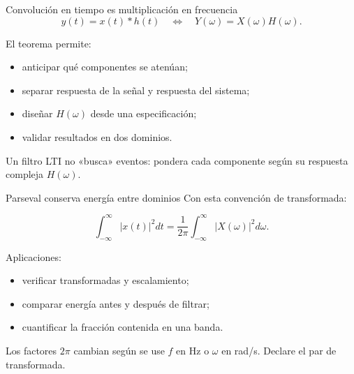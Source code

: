 \documentclass[
  ignorenonframetext,
  aspectratio=169,
  spanish,
  professionalfonts]{beamer}
\providecommand{\tightlist}{%
  \setlength{\itemsep}{0pt}\setlength{\parskip}{0pt}}
\begin{document}
\begin{frame}{Convolución en tiempo es multiplicación en frecuencia}
\protect{}\label{convoluciuxf3n-en-tiempo-es-multiplicaciuxf3n-en-frecuencia}
\[
y(t)=x(t)*h(t)
\quad\Longleftrightarrow\quad
Y(\omega)=X(\omega)H(\omega).
\]

El teorema permite:

\begin{itemize}
\tightlist
\item
  anticipar qué componentes se atenúan;
\item
  separar respuesta de la señal y respuesta del sistema;
\item
  diseñar \(H(\omega)\) desde una especificación;
\item
  validar resultados en dos dominios.
\end{itemize}

\begin{tcolorbox}[enhanced jigsaw, arc=.35mm, bottomrule=.15mm, bottomtitle=1mm, breakable, colback=white, colbacktitle=quarto-callout-important-color!10!white, colframe=quarto-callout-important-color-frame, coltitle=black, left=2mm, leftrule=.75mm, opacityback=0, opacitybacktitle=0.6, rightrule=.15mm, title={Puente hacia filtrado}, titlerule=0mm, toprule=.15mm, toptitle=1mm]

Un filtro LTI no «busca» eventos: pondera cada componente según su
respuesta compleja \(H(\omega)\).

\end{tcolorbox}
\end{frame}

\begin{frame}{Parseval conserva energía entre dominios}
\protect{}\label{parseval-conserva-energuxeda-entre-dominios}
Con esta convención de transformada:

\[
\int_{-\infty}^{\infty}|x(t)|^2dt
=\frac{1}{2\pi}\int_{-\infty}^{\infty}|X(\omega)|^2d\omega.
\]

Aplicaciones:

\begin{itemize}
\tightlist
\item
  verificar transformadas y escalamiento;
\item
  comparar energía antes y después de filtrar;
\item
  cuantificar la fracción contenida en una banda.
\end{itemize}

\begin{tcolorbox}[enhanced jigsaw, arc=.35mm, bottomrule=.15mm, bottomtitle=1mm, breakable, colback=white, colbacktitle=quarto-callout-caution-color!10!white, colframe=quarto-callout-caution-color-frame, coltitle=black, left=2mm, leftrule=.75mm, opacityback=0, opacitybacktitle=0.6, rightrule=.15mm, title={Convenciones}, titlerule=0mm, toprule=.15mm, toptitle=1mm]

Los factores \(2\pi\) cambian según se use \(f\) en Hz o \(\omega\) en
rad/s. Declare el par de transformada.

\end{tcolorbox}
\end{frame}
\end{document}
